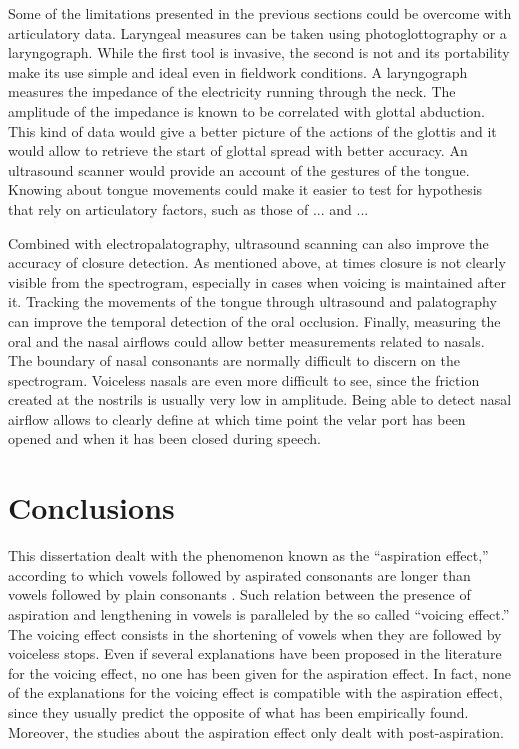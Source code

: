 \documentclass[11pt,a4paper,openany]{memoir}\usepackage[]{graphicx}\usepackage[]{color}
\begin{document}
Some of the limitations presented in the previous sections could be overcome with articulatory data.
Laryngeal measures can be taken using photoglottography or a laryngograph.
While the first tool is invasive, the second is not and its portability make its use simple and ideal even in fieldwork conditions.
A laryngograph measures the impedance of the electricity running through the neck.
The amplitude of the impedance is known to be correlated with glottal abduction.
This kind of data would give a better picture of the actions of the glottis and it would allow to retrieve the start of glottal spread with better accuracy.
An ultrasound scanner would provide an account of the gestures of the tongue.
Knowing about tongue movements could make it easier to test for hypothesis that rely on articulatory factors, such as those of ... and ...

Combined with electropalatography, ultrasound scanning can also improve the accuracy of closure detection.
As mentioned above, at times closure is not clearly visible from the spectrogram, especially in cases when voicing is maintained after it.
Tracking the movements of the tongue through ultrasound and palatography can improve the temporal detection of the oral occlusion.
Finally, measuring the oral and the nasal airflows could allow better measurements related to nasals.
The boundary of nasal consonants are normally difficult to discern on the spectrogram.
Voiceless nasals are even more difficult to see, since the friction created at the nostrils is usually very low in amplitude.
Being able to detect nasal airflow allows to clearly define at which time point the velar port has been opened and when it has been closed during speech.

















\chapter{Conclusions}

This dissertation dealt with the phenomenon known as the ``aspiration effect,'' according to which vowels followed by aspirated consonants are longer than vowels followed by plain consonants \citep{maddieson1976,maddieson1976a}.
Such relation between the presence of aspiration and lengthening in vowels is paralleled by the so called ``voicing effect.''
The voicing effect consists in the shortening of vowels when they are followed by voiceless stops.
Even if several explanations have been proposed in the literature for the voicing effect, no one has been given for the aspiration effect.
In fact, none of the explanations for the voicing effect is compatible with the aspiration effect, since they usually predict the opposite of what has been empirically found.
Moreover, the studies about the aspiration effect only dealt with post-aspiration.
\end{document}
